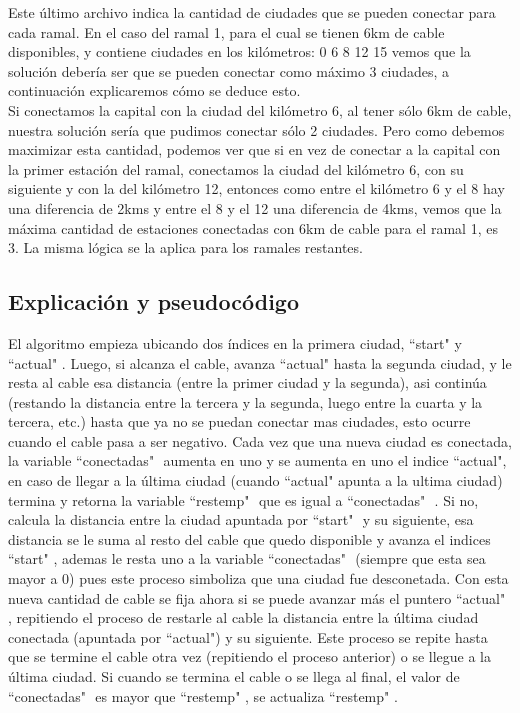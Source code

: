 Este último archivo indica la cantidad de ciudades que se pueden conectar para cada ramal. En el caso del ramal 1, para el cual se tienen 6km de cable disponibles, y contiene ciudades en los kilómetros: 0 6 8 12 15 vemos que la solución debería ser que se pueden conectar como máximo 3 ciudades, a continuación explicaremos cómo se deduce esto.\\

Si conectamos la capital con la ciudad del kilómetro 6, al tener sólo 6km de cable, nuestra solución sería que pudimos conectar sólo 2 ciudades. Pero como debemos maximizar esta cantidad, podemos ver que si en vez de conectar a la capital con la primer estación del ramal, conectamos la ciudad del kilómetro 6, con su siguiente y con la del kilómetro 12, entonces como entre el kilómetro 6 y el 8 hay una diferencia de 2kms y entre el 8 y el 12 una diferencia de 4kms, vemos que la máxima cantidad de estaciones conectadas con 6km de cable para el ramal 1, es 3. La misma lógica se la aplica para los ramales restantes.\\

\subsection{Explicación y pseudocódigo}

El algoritmo empieza ubicando dos índices en la primera ciudad, ``start" $ $y ``actual" $ $. Luego, si alcanza el cable, avanza ``actual"$ $ hasta la segunda ciudad, y le resta al cable esa distancia (entre la primer ciudad y la segunda), asi continúa (restando la distancia entre la tercera y la segunda, luego entre la cuarta y la tercera, etc.) hasta que ya no se puedan conectar mas ciudades, esto ocurre cuando el cable pasa a ser negativo. Cada vez que una nueva ciudad es conectada, la variable ``conectadas" $ $ aumenta en uno y se aumenta en uno el indice ``actual"$ $, en caso de llegar a la última ciudad (cuando ``actual"$ $ apunta a la ultima ciudad) termina y retorna la variable ``restemp" $ $ que es igual a ``$ $conectadas" $ $ . Si no, calcula la distancia entre la ciudad apuntada por ``start" $ $ y su siguiente, esa distancia se le suma al resto del cable que quedo disponible y avanza el indices ``start" $ $, ademas le resta uno a la variable ``$ $conectadas" $ $ (siempre que esta sea mayor a 0) pues este proceso simboliza que una ciudad fue desconetada. Con esta nueva cantidad de cable se fija ahora si se puede avanzar más el puntero ``actual"$ $ , repitiendo el proceso de restarle al cable la distancia entre la última ciudad conectada (apuntada por ``actual"$ $) y su siguiente. Este proceso se repite hasta que se termine el cable otra vez (repitiendo el proceso anterior) o se llegue a la última ciudad. Si cuando se termina el cable o se llega al final, el valor de ``conectadas" $ $ es mayor que ``restemp" $ $, se actualiza ``restemp" $ $.

